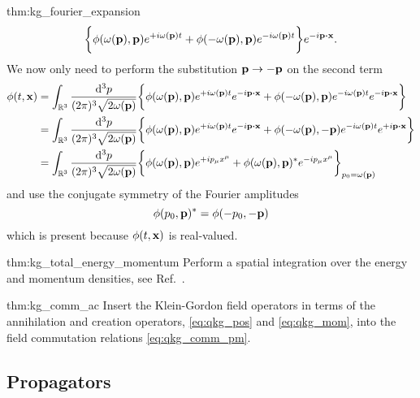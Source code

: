 \begin{delayedproof}{thm:kg_fourier_expansion}
\begin{equation*}
		\biggl\{
			\phi(\omega(\vb{p}),\vb{p})
			e^{+i\omega(\vb{p})t}
			+
			\phi(-\omega(\vb{p}),\vb{p})
			e^{-i\omega(\vb{p})t}
		\biggr\}
		e^{-i\vb{p}\vdot\vb{x}}
		.
	\end{equation*}
	We now only need to perform the substitution $\vb{p}\to-\vb{p}$ on the second term
	\begin{equation*}
		\begin{split}
			\phi(t,\vb{x})
			&=
			\int_{\mathbb{R}^3}\frac{\dd[3]{p}}{(2\pi)^3\sqrt{2\omega(\vb{p})}}
			\biggl\{
				\phi(\omega(\vb{p}),\vb{p})
				e^{+i\omega(\vb{p})t}
				e^{-i\vb{p}\vdot\vb{x}}
				+
				\phi(-\omega(\vb{p}),\vb{p})
				e^{-i\omega(\vb{p})t}
				e^{-i\vb{p}\vdot\vb{x}}
			\biggr\}
			\\
			&=
			\int_{\mathbb{R}^3}\frac{\dd[3]{p}}{(2\pi)^3\sqrt{2\omega(\vb{p})}}
			\biggl\{
				\phi(\omega(\vb{p}),\vb{p})
				e^{+i\omega(\vb{p})t}
				e^{-i\vb{p}\vdot\vb{x}}
				+
				\phi(-\omega(\vb{p}),-\vb{p})
				e^{-i\omega(\vb{p})t}
				e^{+i\vb{p}\vdot\vb{x}}
			\biggr\}
			\\
			&=
			\int_{\mathbb{R}^3}\frac{\dd[3]{p}}{(2\pi)^3\sqrt{2\omega(\vb{p})}}
			\biggl\{
				\phi(\omega(\vb{p}),\vb{p})
				e^{+ip_\mu x^\mu}
				+
				\phi(\omega(\vb{p}),\vb{p})^*
				e^{-ip_\mu x^\mu}
			\biggr\}_{p_0=\omega(\vb{p})}
		\end{split}
	\end{equation*}
	and use the conjugate symmetry of the Fourier amplitudes
	\begin{equation*}
		\phi(p_0,\vb{p})^*
		=
		\phi(-p_0,-\vb{p})
	\end{equation*}
	which is present because $\phi(t,\vb{x})$ is real-valued.
\end{delayedproof}
\begin{delayedproof}{thm:kg_total_energy_momentum}
	Perform a spatial integration over the energy and momentum densities, see Ref.~\cite{Peskin1995}.
\end{delayedproof}
\begin{delayedproof}{thm:kg_comm_ac}
	Insert the Klein-Gordon field operators in terms of the annihilation and creation operators, \cref{eq:qkg_pos} and \cref{eq:qkg_mom}, into the field commutation relations \cref{eq:qkg_comm_pm}.
\end{delayedproof}

\subsection{Propagators}

